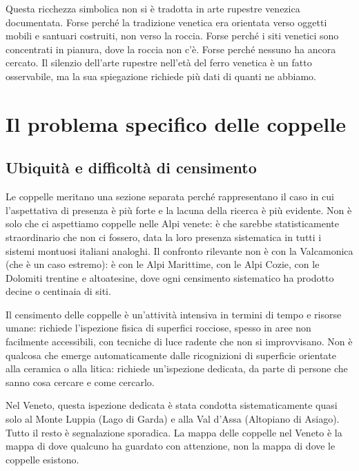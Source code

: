 Questa ricchezza simbolica non si è tradotta in arte rupestre venezica documentata. Forse perché la tradizione venetica era orientata verso oggetti mobili e santuari costruiti, non verso la roccia. Forse perché i siti venetici sono concentrati in pianura, dove la roccia non c'è. Forse perché nessuno ha ancora cercato. Il silenzio dell'arte rupestre nell'età del ferro venetica è un fatto osservabile, ma la sua spiegazione richiede più dati di quanti ne abbiamo.

\section{Il problema specifico delle coppelle}

\subsection{Ubiquità e difficoltà di censimento}

Le coppelle meritano una sezione separata perché rappresentano il caso in cui l'aspettativa di presenza è più forte e la lacuna della ricerca è più evidente. Non è solo che ci aspettiamo coppelle nelle Alpi venete: è che sarebbe statisticamente straordinario che non ci fossero, data la loro presenza sistematica in tutti i sistemi montuosi italiani analoghi. Il confronto rilevante non è con la Valcamonica (che è un caso estremo): è con le Alpi Marittime, con le Alpi Cozie, con le Dolomiti trentine e altoatesine, dove ogni censimento sistematico ha prodotto decine o centinaia di siti.

Il censimento delle coppelle è un'attività intensiva in termini di tempo e risorse umane: richiede l'ispezione fisica di superfici rocciose, spesso in aree non facilmente accessibili, con tecniche di luce radente che non si improvvisano. Non è qualcosa che emerge automaticamente dalle ricognizioni di superficie orientate alla ceramica o alla litica: richiede un'ispezione dedicata, da parte di persone che sanno cosa cercare e come cercarlo.

Nel Veneto, questa ispezione dedicata è stata condotta sistematicamente quasi solo al Monte Luppia (Lago di Garda) e alla Val d'Assa (Altopiano di Asiago). Tutto il resto è segnalazione sporadica. La mappa delle coppelle nel Veneto è la mappa di dove qualcuno ha guardato con attenzione, non la mappa di dove le coppelle esistono.

